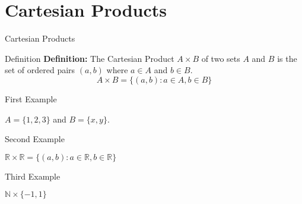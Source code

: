 \documentclass[
  ignorenonframetext,
  t]{beamer}
\author{}
\date{}
\begin{document}
\hypertarget{cartesian-products}{%
\section{Cartesian Products}\label{cartesian-products}}

\begin{frame}{Cartesian Products}
\newcommand{\R}{\mathbb{R}}
\newcommand{\N}{\mathbb{N}}
\end{frame}

\begin{frame}{Definition}
\protect\hypertarget{definition}{}
\textbf{Definition:} The Cartesian Product \(A\times B\) of two sets
\(A\) and \(B\) is the set of ordered pairs \((a,b)\) where \(a\in A\)
and \(b\in B\). \[
A\times B =\{(a,b):a\in A, b\in B\}
\] \vfill\eject
\end{frame}

\begin{frame}{First Example}
\protect\hypertarget{first-example}{}
\begin{block}{\(A=\{1,2,3\}\) and \(B=\{x,y\}\).}
\protect\hypertarget{a123-and-bxy.}{}
\end{block}
\end{frame}

\begin{frame}{Second Example}
\protect\hypertarget{second-example}{}
\begin{block}{\(\mathbb{R}\times\mathbb{R}= \{(a,b): a\in \mathbb{R}, b\in\mathbb{R}\}\)}
\protect\hypertarget{mathbbrtimesmathbbr-ab-ain-mathbbr-binmathbbr}{}
\end{block}
\end{frame}

\begin{frame}{Third Example}
\protect\hypertarget{third-example}{}
\begin{block}{\(\mathbb{N}\times\{-1,1\}\)}
\protect\hypertarget{mathbbntimes-11}{}
\end{block}
\end{frame}
\end{document}
